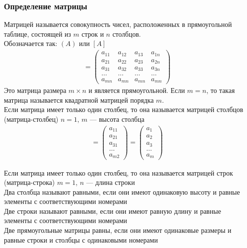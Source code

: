 \documentclass[a4paper, 11pt, oneside]{article}
\begin{document}
\subsubsection{Определение матрицы}
Матрицей называется совокупность чисел, расположенных в прямоугольной таблице, состоящей из $m$ строк и $n$ столбцов.\\
Обозначается так: $(A)$ или $[A]$\\

\begin{gather*}
	[A] =
	\begin{pmatrix}
		a_{11}& a_{12}& a_{13}& a_{1n}\\
		a_{21}& a_{22}& a_{23}& a_{2n}\\
		a_{31}& a_{32}& a_{33}& a_{3n}\\
		\dots & \dots & \dots & \dots\\
		a_{mn}& a_{mn}& a_{mn}& a_{mn}
	\end{pmatrix}
\end{gather*}
Это матрица размера $m \times n$ и является прямоугольной. Если $m = n$, то такая матрица называется квадратной матрицей порядка $m$.\\
Если матрица имеет только один столбец, то она называется матрицей столбцов (матрица-столбец) $n = 1$, $m$ --- высота столбца
\begin{gather*}
	[A] =
	\begin{pmatrix}
		a_{11}\\
		a_{21}\\
		a_{31}\\
		\dots\\
		a_{m2}
	\end{pmatrix}
	=
	\begin{pmatrix}
		a_{1}\\
		a_{2}\\
		a_{3}\\
		\dots\\
		a_{m}
	\end{pmatrix}
\end{gather*}

Если матрица имеет только один столбец, то она называется матрицей строк (матрица-строка) $m = 1$, $n$ --- длина строки\\
Два столбца называют равными, если они имеют одинаковую высоту и равные элементы с соответствующими номерами\\
Две строки называют равными, если они имеют равную длину и равные элементы с соответствующими номерами\\
Две прямоугольные матрицы равны, если они имеют одинаковые размеры и равные строки и столбцы с одинаковыми номерами\\
\end{document}
